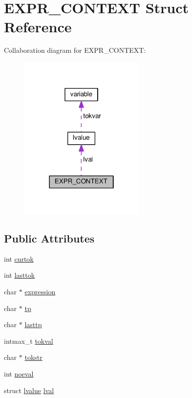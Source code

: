 \hypertarget{structEXPR__CONTEXT}{}\section{E\+X\+P\+R\+\_\+\+C\+O\+N\+T\+E\+XT Struct Reference}
\label{structEXPR__CONTEXT}


Collaboration diagram for E\+X\+P\+R\+\_\+\+C\+O\+N\+T\+E\+XT\+:
\nopagebreak
\begin{figure}[H]
\begin{center}
\leavevmode
\includegraphics[width=178pt]{structEXPR__CONTEXT__coll__graph}
\end{center}
\end{figure}
\subsection*{Public Attributes}
\begin{DoxyCompactItemize}
\item 
int \hyperlink{structEXPR__CONTEXT_a4d2a3800331cf9f6c553a52a58e2a7ee}{curtok}
\item 
int \hyperlink{structEXPR__CONTEXT_acaf7c6bd8d7c56b7ddc1b8aa10de62fe}{lasttok}
\item 
char $\ast$ \hyperlink{structEXPR__CONTEXT_a708aed9cc491f274bbbeb63f76a2d41f}{expression}
\item 
char $\ast$ \hyperlink{structEXPR__CONTEXT_ab7a73351a352ce4e87d11ca20144ecdf}{tp}
\item 
char $\ast$ \hyperlink{structEXPR__CONTEXT_a69e10a40e10bd2502db453c4d593a464}{lasttp}
\item 
intmax\+\_\+t \hyperlink{structEXPR__CONTEXT_abbae8e63dab085277ea9e730a3b84692}{tokval}
\item 
char $\ast$ \hyperlink{structEXPR__CONTEXT_a5b236994684e80356f71a1aec4f7d0c7}{tokstr}
\item 
int \hyperlink{structEXPR__CONTEXT_a164e4613724fa3f72f3460f58d595e5a}{noeval}
\item 
struct \hyperlink{structlvalue}{lvalue} \hyperlink{structEXPR__CONTEXT_ab497084844b30afe35fbb51b06fb6505}{lval}
\end{DoxyCompactItemize}


